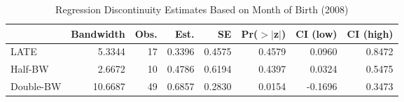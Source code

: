 \begin{table}[ht]
\centering
\begin{tabular}{lrrrrrrr}
  \hline
 & Bandwidth & Obs. & Est. & SE & Pr($>$$|$z$|$) & CI (low) & CI (high) \\ 
  \hline
LATE & 5.3344 & 17 & 0.3396 & 0.4575 & 0.4579 & 0.0960 & 0.8472 \\ 
  Half-BW & 2.6672 & 10 & 0.4786 & 0.6194 & 0.4397 & 0.0324 & 0.5475 \\ 
  Double-BW & 10.6687 & 49 & 0.6857 & 0.2830 & 0.0154 & -0.1696 & 0.3473 \\ 
   \hline
\end{tabular}
\caption{Regression Discontinuity Estimates Based on Month of Birth (2008)} 
\label{tab:rd2008m1}
\end{table}
